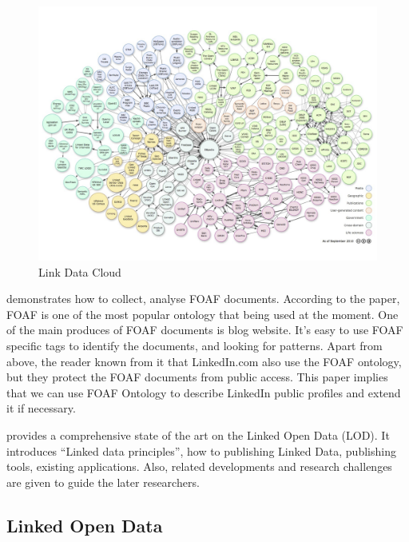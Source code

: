 \begin{description}
\begin{figure}[ht!]
\centering
\includegraphics[width=150mm]{images/link-data-cloud.png}
\caption{Link Data Cloud\protect\footnotemark}
\label{fig:LinkDataCloud}
\end{figure}
\end{description}


\cite{ding2005} demonstrates how to collect, analyse FOAF documents. According to the paper, FOAF is one of the most popular ontology that being used at the moment. One of the main produces of FOAF documents is blog website. It's easy to use FOAF specific tags to identify the documents, and looking for patterns. Apart from above, the reader known from it that LinkedIn.com also use the FOAF ontology, but they protect the FOAF documents from public access. This paper implies that we can use FOAF Ontology to describe LinkedIn public profiles and extend it if necessary. 

\cite{bizer2009} provides a comprehensive state of the art on the Linked Open Data (LOD). It introduces ``Linked data principles'', how to publishing Linked Data, publishing tools, existing applications. Also, related developments and research challenges are given to guide the later researchers.

\subsection{Linked Open Data}

